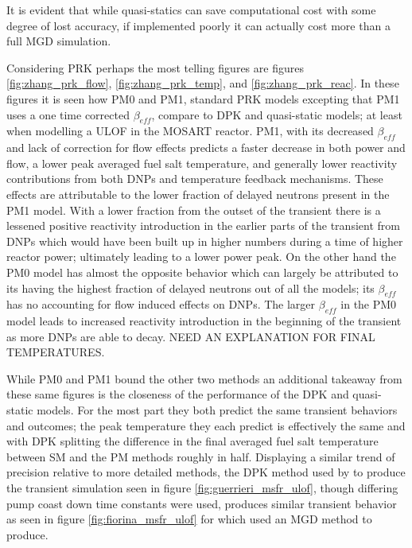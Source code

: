 \documentclass[review]{elsarticle}
\begin{document}
It is evident that while quasi-statics can save computational cost with some
degree of lost accuracy, if implemented poorly it can actually cost more than
a full MGD simulation.

\par Considering PRK perhaps the most telling figures are figures
\ref{fig:zhang_prk_flow}, \ref{fig:zhang_prk_temp}, and 
\ref{fig:zhang_prk_reac}. In these figures it is seen how PM0 and PM1,
standard PRK models excepting that PM1 uses a one time corrected $\beta_{eff}$,
compare to DPK and quasi-static models; at least when modelling a ULOF in
the MOSART reactor. PM1, with its decreased $\beta_{eff}$ and lack of correction
for flow effects predicts a faster decrease in both power and flow, a lower
peak averaged fuel salt temperature, and generally lower reactivity
contributions from both DNPs and temperature feedback mechanisms. These
effects are attributable to the lower fraction of delayed neutrons present
in the PM1 model. With a lower fraction from the outset of the transient there
is a lessened positive reactivity introduction in the earlier parts of the
transient from DNPs which would have been built up in higher numbers during
a time of higher reactor power; ultimately leading to a lower power peak.
On the other hand the PM0 model has almost
the opposite behavior which can largely be attributed to its having the
highest fraction of delayed neutrons out of all the models; its $\beta_{eff}$
has no accounting for flow induced effects on DNPs. The larger
$\beta_{eff}$ in the PM0 model leads to increased reactivity introduction
in the beginning of the transient as more DNPs are able to decay.
 NEED AN EXPLANATION FOR FINAL TEMPERATURES. 
\par While PM0 and PM1 bound the other two methods an additional takeaway from
these same figures is the closeness of the performance of the DPK and
quasi-static models. For the most part they both predict the same transient
behaviors and outcomes; the peak temperature they each predict is effectively
the same and with DPK splitting the difference in the final averaged fuel salt
temperature between SM and the PM methods roughly in half. Displaying
a similar trend of precision relative to more detailed methods, the DPK method
 used by \cite{guerrieri_investigation_2013} to produce
the transient simulation seen in figure \ref{fig:guerrieri_msfr_ulof}, though
differing pump coast down time constants were used, produces similar transient
behavior as seen in figure \ref{fig:fiorina_msfr_ulof} for which
\cite{fiorina_modelling_2014} used an MGD method to produce.
\end{document}
